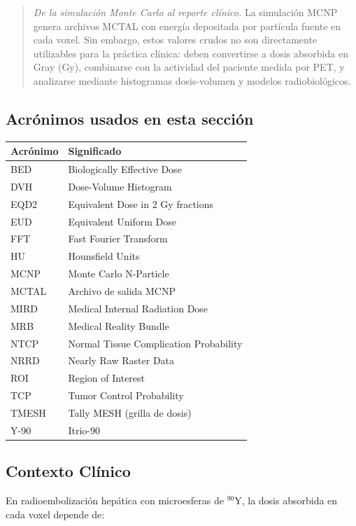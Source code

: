 \documentclass[12pt,a4paper]{article}
\begin{document}
\begin{quote}
\textit{De la simulación Monte Carlo al reporte clínico.} La simulación MCNP genera archivos MCTAL con energía depositada por partícula fuente en cada voxel. Sin embargo, estos valores crudos no son directamente utilizables para la práctica clínica: deben convertirse a dosis absorbida en Gray (Gy), combinarse con la actividad del paciente medida por PET, y analizarse mediante histogramas dosis-volumen y modelos radiobiológicos.
\end{quote}

\subsection*{Acrónimos usados en esta sección}

\begin{tabular}{p{3cm} p{12cm}}
\toprule
\textbf{Acrónimo} & \textbf{Significado} \\
\midrule
BED & Biologically Effective Dose \\
DVH & Dose-Volume Histogram \\
EQD2 & Equivalent Dose in 2 Gy fractions \\
EUD & Equivalent Uniform Dose \\
FFT & Fast Fourier Transform \\
HU & Hounsfield Units \\
MCNP & Monte Carlo N-Particle \\
MCTAL & Archivo de salida MCNP \\
MIRD & Medical Internal Radiation Dose \\
MRB & Medical Reality Bundle \\
NTCP & Normal Tissue Complication Probability \\
NRRD & Nearly Raw Raster Data \\
ROI & Region of Interest \\
TCP & Tumor Control Probability \\
TMESH & Tally MESH (grilla de dosis) \\
Y-90 & Itrio-90 \\
\bottomrule
\end{tabular}

\subsection{Contexto Clínico}

En radioembolización hepática con microesferas de $^{90}$Y, la dosis absorbida en cada voxel depende de:
\end{document}
